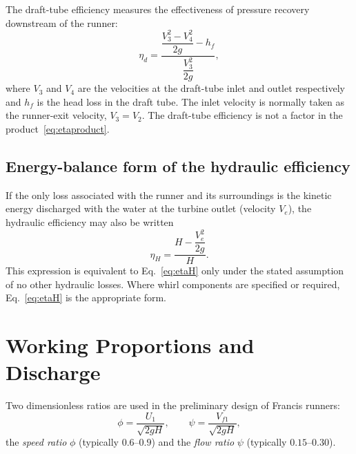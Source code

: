 \documentclass[11pt,a4paper]{article}
\numberwithin{equation}{section}
\begin{document}
The draft-tube efficiency measures the effectiveness of pressure recovery downstream of the runner:
\begin{equation}
  \eta_d = \frac{\dfrac{V_3^{2} - V_4^{2}}{2g} - h_f}{\dfrac{V_3^{2}}{2g}},
  \label{eq:etad}
\end{equation}
where $V_3$ and $V_4$ are the velocities at the draft-tube inlet and outlet respectively and $h_f$ is the head loss in the draft tube. The inlet velocity is normally taken as the runner-exit velocity, $V_3 = V_2$. The draft-tube efficiency is not a factor in the product~\eqref{eq:etaproduct}.

\subsection{Energy-balance form of the hydraulic efficiency}

If the only loss associated with the runner and its surroundings is the kinetic energy discharged with the water at the turbine outlet (velocity $V_e$), the hydraulic efficiency may also be written
\begin{equation}
  \eta_H = \frac{H - \dfrac{V_e^{2}}{2g}}{H}.
  \label{eq:etaH-balance}
\end{equation}
This expression is equivalent to Eq.~\eqref{eq:etaH} only under the stated assumption of no other hydraulic losses. Where whirl components are specified or required, Eq.~\eqref{eq:etaH} is the appropriate form.

\section{Working Proportions and Discharge}
\label{sec:proportions}

Two dimensionless ratios are used in the preliminary design of Francis runners:
\begin{equation}
  \phi = \frac{U_1}{\sqrt{2gH}}, \qquad \psi = \frac{V_{f1}}{\sqrt{2gH}},
  \label{eq:ratios}
\end{equation}
the \emph{speed ratio} $\phi$ (typically $0.6$--$0.9$) and the \emph{flow ratio} $\psi$ (typically $0.15$--$0.30$).
\end{document}
